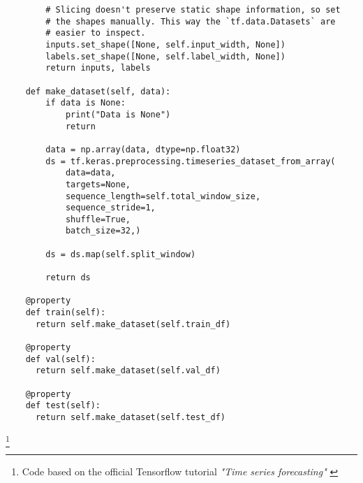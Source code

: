 \begin{verbatim}
        # Slicing doesn't preserve static shape information, so set
        # the shapes manually. This way the `tf.data.Datasets` are
        # easier to inspect.
        inputs.set_shape([None, self.input_width, None])
        labels.set_shape([None, self.label_width, None])
        return inputs, labels
    
    def make_dataset(self, data):
        if data is None:
            print("Data is None")
            return
    
        data = np.array(data, dtype=np.float32)
        ds = tf.keras.preprocessing.timeseries_dataset_from_array(
            data=data,
            targets=None,
            sequence_length=self.total_window_size,
            sequence_stride=1,
            shuffle=True,
            batch_size=32,)
    
        ds = ds.map(self.split_window)
    
        return ds
    
    @property
    def train(self):
      return self.make_dataset(self.train_df)
    
    @property
    def val(self):
      return self.make_dataset(self.val_df)
    
    @property
    def test(self):
      return self.make_dataset(self.test_df)
\end{verbatim}

\footnote{Code based on the official Tensorflow tutorial \textit{"Time series forecasting"} \cite{tensorflow2015-whitepaper}}